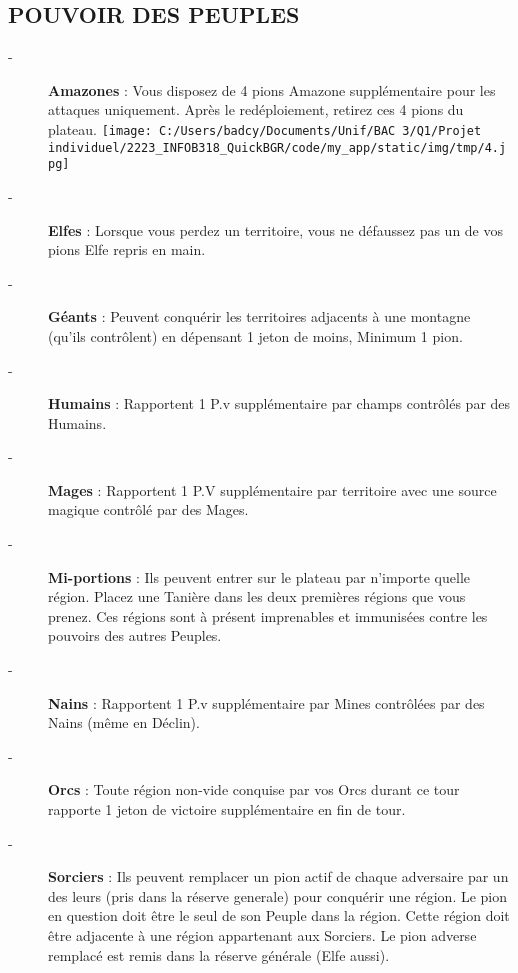 \documentclass{scrartcl}%
\begin{document}
\subsection{ POUVOIR DES PEUPLES
}%
\label{subsec:POUVOIRDESPEUPLES}%
\begin{description}%
\item[{-} ]%
%
\textcolor{mygreen}{%
\textbf{Amazones}%
}%
\textit{ }%
 : Vous disposez de 4 pions Amazone supplémentaire pour les attaques uniquement. Après le redéploiement, retirez ces 4 pions du plateau.%
\texttt{[image: C:/Users/badcy/Documents/Unif/BAC 3/Q1/Projet individuel/2223\_INFOB318\_QuickBGR/code/my\_app/static/img/tmp/4.jpg]}%

%

%
\item[{-} ]%
%
\textcolor{mygreen}{%
\textbf{Elfes}%
}%
\textit{ }%
 : Lorsque vous perdez un territoire, vous ne défaussez pas un de vos pions Elfe repris en main.
%
\item[{-} ]%
%
\textcolor{mygreen}{%
\textbf{Géants}%
}%
\textit{ }%
 : Peuvent conquérir les territoires adjacents à une montagne (qu'ils contrôlent) en dépensant 1 jeton de moins, Minimum 1 pion.
%
\item[{-} ]%
%
\textcolor{mygreen}{%
\textbf{Humains}%
}%
\textit{ }%
 : Rapportent 1 P.v supplémentaire par champs contrôlés par des Humains.
%
\item[{-} ]%
%
\textcolor{mygreen}{%
\textbf{Mages}%
}%
\textit{ }%
 : Rapportent 1 P.V supplémentaire par territoire avec une source magique contrôlé par des Mages.
%
\item[{-} ]%
%
\textcolor{mygreen}{%
\textbf{Mi{-}portions}%
}%
\textit{ }%
 : Ils peuvent entrer sur le plateau par n'importe quelle région. Placez une Tanière dans les deux premières régions que vous prenez. Ces régions sont à présent imprenables et immunisées contre les pouvoirs des autres Peuples.
%
\item[{-} ]%
%
\textcolor{mygreen}{%
\textbf{Nains}%
}%
\textit{ }%
 : Rapportent 1 P.v supplémentaire par Mines contrôlées par des Nains (même en Déclin).
%
\item[{-} ]%
%
\textcolor{mygreen}{%
\textbf{Orcs}%
}%
\textit{ }%
 : Toute région non{-}vide conquise par vos Orcs durant ce tour rapporte 1 jeton de victoire supplémentaire en fin de tour.
%
\item[{-} ]%
%
\textcolor{mygreen}{%
\textbf{Sorciers}%
}%
\textit{ }%
 : Ils peuvent remplacer un pion actif de chaque adversaire par un des leurs (pris dans la réserve generale) pour conquérir une région. Le pion en question doit être le seul de son Peuple dans la région. Cette région doit être adjacente à une région appartenant aux Sorciers. Le pion adverse remplacé est remis dans la réserve générale (Elfe aussi).

\end{description}
\end{document}
